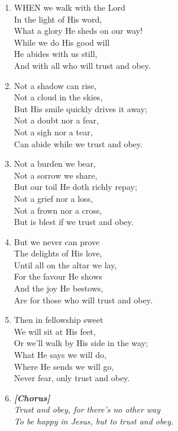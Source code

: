 \documentclass[11pt,a4paper]{article}
\begin{document}
\begin{enumerate}
    \item WHEN we walk with the Lord \\
        In the light of His word, \\
        What a glory He sheds on our way! \\
        While we do His good will \\
        He abides with us still, \\
        And with all who will trust and obey.

    \item Not a shadow can rise, \\
        Not a cloud in the skies, \\
        But His smile quickly drives it away; \\
        Not a doubt nor a fear, \\
        Not a sigh nor a tear, \\
        Can abide while we trust and obey.

    \item Not a burden we bear, \\
        Not a sorrow we share, \\
        But our toil He doth richly repay; \\
        Not a grief nor a loss, \\
        Not a frown nor a cross, \\
        But is blest if we trust and obey.

    \item But we never can prove \\
        The delights of His love, \\
        Until all on the altar we lay, \\
        For the favour He shows \\
        And the joy He bestows, \\
        Are for those who will trust and obey.

    \item Then in fellowship sweet \\
        We will sit at His feet, \\
        Or we'll walk by His side in the way; \\
        What He says we will do, \\
        Where He sends we will go, \\
        Never fear, only trust and obey.

    \item[] \vspace{0.4em}
    \textbf{\textit{[Chorus]}} \\
    \textit{Trust and obey, for there's no other way} \\
    \textit{To be happy in Jesus, but to trust and obey.}
    \vspace{0.4em}

\end{enumerate}
\end{document}
